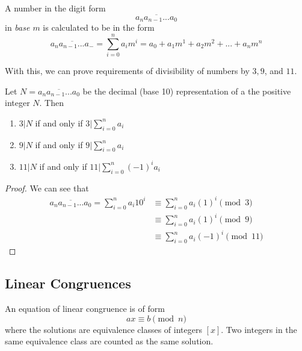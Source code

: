 \documentclass{article}
\newcounter{theorem}[section]
\newcounter{definition}[section]
\begin{document}
\begin{definition}
  \label{def:base-m-representation}
A number in the digit form 
\begin{equation}
  \overline{a_n a_{n-1} ...a_0}
\end{equation}
in \textit{base $m$} is calculated to be in the form 
\begin{equation}
  \overline{a_n a_{n-1} ...a_-} = \sum_{i=0}^n a_i m^i = a_0 + a_1 m^1 + a_2 m^2 + ... + a_n m^n
\end{equation}
\end{definition}

With this, we can prove requirements of divisibility of numbers by $3, 9$, and $11$. 

\begin{theorem}
  \label{thm:divisibility-tests-from-decimal-digits}
Let $N = \overline{a_n a_{n-1} ...a_0}$ be the decimal (base 10) representation of a the positive integer $N$. Then 
\begin{enumerate}
    \item $3|N$ if and only if $3 \big| \sum_{i=0}^n a_i$
    \item $9|N$ if and only if $9 \big| \sum_{i=0}^n a_i$
    \item $11|N$ if and only if $11 \big| \sum_{i=0}^n (-1)^{i} a_i$
\end{enumerate}
\end{theorem}
\begin{proof}
We can see that 
\begin{align*}
    \overline{a_n a_{n-1} ...a_0} = \sum_{i=0}^n a_i 10^i & \equiv \sum_{i=0}^n a_i (1)^i \pmod{3} \\
    & \equiv \sum_{i=0}^n a_i (1)^i \pmod{9} \\
    & \equiv \sum_{i=0}^n a_i (-1)^i \pmod{11}
\end{align*}
\end{proof}

\subsection{Linear Congruences}
\begin{definition}
  \label{def:linear-congruence-equation}
An equation of linear congruence is of form 
\begin{equation}
  a x \equiv b \pmod{n}
\end{equation}
where the solutions are equivalence classes of integers $[x]$. Two integers in the same equivalence class are counted as the same solution. 
\end{definition}
\end{document}

